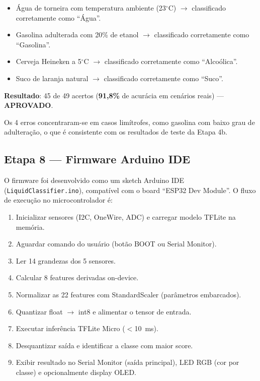\documentclass[12pt, a4paper]{article}
\begin{document}
\begin{itemize}
  \item \'{A}gua de torneira com temperatura ambiente (23$^\circ$C) $\rightarrow$ classificado corretamente como ``\'{A}gua''.
  \item Gasolina adulterada com 20\% de etanol $\rightarrow$ classificado corretamente como ``Gasolina''.
  \item Cerveja Heineken a 5$^\circ$C $\rightarrow$ classificado corretamente como ``Alco\'{o}lica''.
  \item Suco de laranja natural $\rightarrow$ classificado corretamente como ``Suco''.
\end{itemize}

\textbf{Resultado}: 45 de 49 acertos (\textbf{91,8\%} de acur\'{a}cia em cen\'{a}rios reais) --- \textbf{APROVADO}.

Os 4 erros concentraram-se em casos limítrofes, como gasolina com baixo grau de adulteração, o que é consistente com os resultados de teste da Etapa 4b.

\subsection{Etapa 8 --- Firmware Arduino IDE}

O firmware foi desenvolvido como um sketch Arduino IDE (\texttt{LiquidClassifier.ino}), compat\'{i}vel com o board ``ESP32 Dev Module''. O fluxo de execu\c{c}\~{a}o no microcontrolador \'{e}:

\begin{enumerate}
  \item Inicializar sensores (I2C, OneWire, ADC) e carregar modelo TFLite na mem\'{o}ria.
  \item Aguardar comando do usu\'{a}rio (bot\~{a}o BOOT ou Serial Monitor).
  \item Ler 14 grandezas dos 5 sensores.
  \item Calcular 8 features derivadas on-device.
  \item Normalizar as 22 features com StandardScaler (par\^{a}metros embarcados).
  \item Quantizar float $\rightarrow$ int8 e alimentar o tensor de entrada.
  \item Executar infer\^{e}ncia TFLite Micro ($<$10~ms).
  \item Desquantizar sa\'{i}da e identificar a classe com maior score.
  \item Exibir resultado no Serial Monitor (sa\'{i}da principal), LED RGB (cor por classe) e opcionalmente display OLED.
\end{enumerate}
\end{document}
